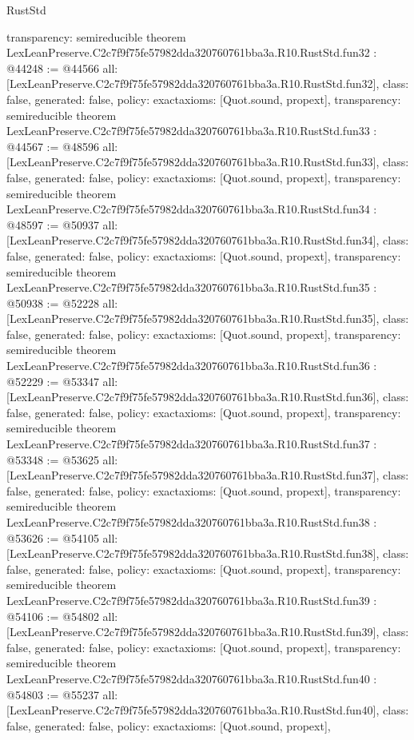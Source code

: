 \begin{lexlean}{RustStd}
\begin{coremodule}
{  transparency: semireducible
}
theorem LexLeanPreserve.C2c7f9f75fe57982dda320760761bba3a.R10.RustStd.fun32 : @44248 := @44566 {
  all: [LexLeanPreserve.C2c7f9f75fe57982dda320760761bba3a.R10.RustStd.fun32],
  class: false,
  generated: false,
  policy: exact{axioms: [Quot.sound, propext]},
  transparency: semireducible
}
theorem LexLeanPreserve.C2c7f9f75fe57982dda320760761bba3a.R10.RustStd.fun33 : @44567 := @48596 {
  all: [LexLeanPreserve.C2c7f9f75fe57982dda320760761bba3a.R10.RustStd.fun33],
  class: false,
  generated: false,
  policy: exact{axioms: [Quot.sound, propext]},
  transparency: semireducible
}
theorem LexLeanPreserve.C2c7f9f75fe57982dda320760761bba3a.R10.RustStd.fun34 : @48597 := @50937 {
  all: [LexLeanPreserve.C2c7f9f75fe57982dda320760761bba3a.R10.RustStd.fun34],
  class: false,
  generated: false,
  policy: exact{axioms: [Quot.sound, propext]},
  transparency: semireducible
}
theorem LexLeanPreserve.C2c7f9f75fe57982dda320760761bba3a.R10.RustStd.fun35 : @50938 := @52228 {
  all: [LexLeanPreserve.C2c7f9f75fe57982dda320760761bba3a.R10.RustStd.fun35],
  class: false,
  generated: false,
  policy: exact{axioms: [Quot.sound, propext]},
  transparency: semireducible
}
theorem LexLeanPreserve.C2c7f9f75fe57982dda320760761bba3a.R10.RustStd.fun36 : @52229 := @53347 {
  all: [LexLeanPreserve.C2c7f9f75fe57982dda320760761bba3a.R10.RustStd.fun36],
  class: false,
  generated: false,
  policy: exact{axioms: [Quot.sound, propext]},
  transparency: semireducible
}
theorem LexLeanPreserve.C2c7f9f75fe57982dda320760761bba3a.R10.RustStd.fun37 : @53348 := @53625 {
  all: [LexLeanPreserve.C2c7f9f75fe57982dda320760761bba3a.R10.RustStd.fun37],
  class: false,
  generated: false,
  policy: exact{axioms: [Quot.sound, propext]},
  transparency: semireducible
}
theorem LexLeanPreserve.C2c7f9f75fe57982dda320760761bba3a.R10.RustStd.fun38 : @53626 := @54105 {
  all: [LexLeanPreserve.C2c7f9f75fe57982dda320760761bba3a.R10.RustStd.fun38],
  class: false,
  generated: false,
  policy: exact{axioms: [Quot.sound, propext]},
  transparency: semireducible
}
theorem LexLeanPreserve.C2c7f9f75fe57982dda320760761bba3a.R10.RustStd.fun39 : @54106 := @54802 {
  all: [LexLeanPreserve.C2c7f9f75fe57982dda320760761bba3a.R10.RustStd.fun39],
  class: false,
  generated: false,
  policy: exact{axioms: [Quot.sound, propext]},
  transparency: semireducible
}
theorem LexLeanPreserve.C2c7f9f75fe57982dda320760761bba3a.R10.RustStd.fun40 : @54803 := @55237 {
  all: [LexLeanPreserve.C2c7f9f75fe57982dda320760761bba3a.R10.RustStd.fun40],
  class: false,
  generated: false,
  policy: exact{axioms: [Quot.sound, propext]},
}
\end{coremodule}
\end{lexlean}
